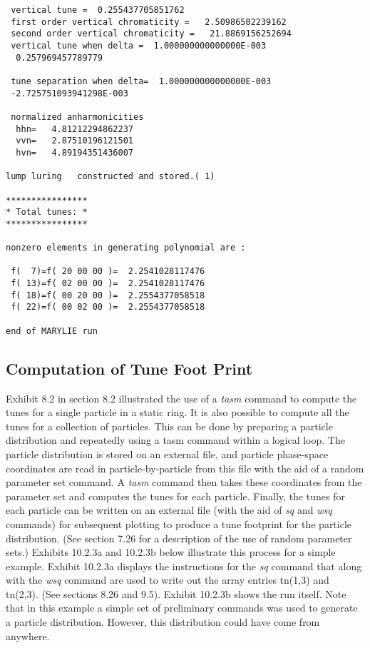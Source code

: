 \begin{footnotesize}
\begin{verbatim}
 vertical tune =  0.255437705851762
 first order vertical chromaticity =   2.50986502239162
 second order vertical chromaticity =   21.8869156252694
 vertical tune when delta =  1.000000000000000E-003
  0.257969457789779

 tune separation when delta=  1.000000000000000E-003
 -2.725751093941298E-003

 normalized anharmonicities
  hhn=   4.81212294862237
  vvn=   2.87510196121501
  hvn=   4.89194351436007

lump luring   constructed and stored.( 1)

****************
* Total tunes: *
****************

nonzero elements in generating polynomial are :

 f(  7)=f( 20 00 00 )=  2.2541028117476
 f( 13)=f( 02 00 00 )=  2.2541028117476
 f( 18)=f( 00 20 00 )=  2.2554377058518
 f( 22)=f( 00 02 00 )=  2.2554377058518

end of MARYLIE run
\end{verbatim}
\end{footnotesize}

\subsection{Computation of Tune Foot Print}\label{footprint}  
Exhibit 8.2 in section 8.2 illustrated the use of a {\em tasm} command to compute the tunes for a single particle in a static ring.  It is also possible to compute all the tunes for a collection of particles.  This can be done by preparing a particle distribution and repeatedly using a tasm command within a logical loop.  The particle distribution is stored on an external file, and particle phase-space coordinates are read in particle-by-particle from this file with the aid of a random parameter set command. A {\em tasm} command then takes these coordinates from the parameter set and computes the tunes for each particle.   Finally, the tunes for each particle can be written on an external file (with the aid of {\em sq} and {\em wsq} commands) for subsequent plotting to produce a tune footprint for the particle distribution.  (See section 7.26 for a description of the use of random parameter sets.)  Exhibits 10.2.3a and 10.2.3b below illustrate this process for a simple example.  Exhibit 10.2.3a displays the instructions for the {\em sq} command that along with the {\em wsq} command are used to write out the array entries tn(1,3) and tn(2,3).  (See sections 8.26 and 9.5).  Exhibit 10.2.3b shows the \Mary run itself.  Note that in this example a simple set of preliminary commands was used to generate a particle distribution.  However, this distribution could have come from anywhere.

